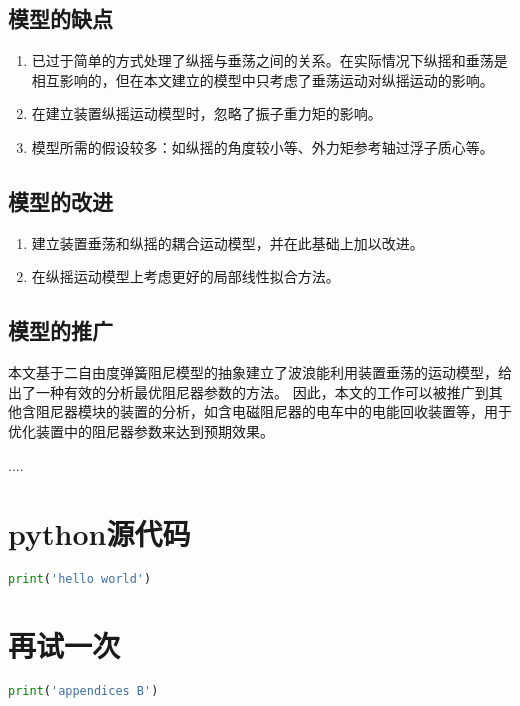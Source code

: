 \documentclass[withoutpreface,bwprint]{cumcmthesis} %
\begin{document}
    \subsection{模型的缺点}
    \begin{enumerate}
        \item 已过于简单的方式处理了纵摇与垂荡之间的关系。在实际情况下纵摇和垂荡是相互影响的，但在本文建立的模型中只考虑了垂荡运动对纵摇运动的影响。
        \item 在建立装置纵摇运动模型时，忽略了振子重力矩的影响。
        \item 模型所需的假设较多：如纵摇的角度较小等、外力矩参考轴过浮子质心等。
    \end{enumerate}
    \subsection{模型的改进}
    \begin{enumerate}
        \item 建立装置垂荡和纵摇的耦合运动模型，并在此基础上加以改进。
        \item 在纵摇运动模型上考虑更好的局部线性拟合方法。
    \end{enumerate}
    \subsection{模型的推广}
    本文基于二自由度弹簧阻尼模型的抽象建立了波浪能利用装置垂荡的运动模型，给出了一种有效的分析最优阻尼器参数的方法。
    因此，本文的工作可以被推广到其他含阻尼器模块的装置的分析，如含电磁阻尼器的电车中的电能回收装置等，用于优化装置中的阻尼器参数来达到预期效果。
    
    \begin{thebibliography}{9}%
         ....
    \end{thebibliography}

    \newpage
    \begin{appendices}
        \section{python源代码}

        \begin{lstlisting}[language=python]
            print('hello world')
        \end{lstlisting}

        \section{再试一次}

        \begin{lstlisting}[language=python]
            print('appendices B')
        \end{lstlisting}
    \end{appendices}
\end{document}
